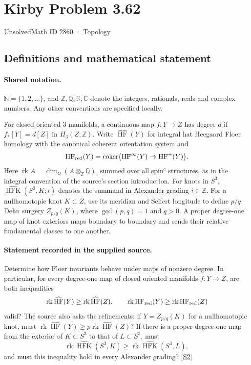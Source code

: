 \documentclass[11pt]{article}
\newcommand{\sref}[2]{\hyperlink{source:#1:#2}{[S#2]}}
\begin{document}
\setcounter{section}{2859}
\section{Kirby Problem 3.62}\label{2860}
{\small\sffamily UnsolvedMath ID 2860 · Topology}
\subsection{Definitions and mathematical statement}

\paragraph{Shared notation.}$\mathbb N=\{1,2,\ldots\}$, and $\mathbb Z,\mathbb Q,\mathbb R,\mathbb C$ denote the integers, rationals, reals and complex numbers. Any other conventions are specified locally.


For closed oriented $3$-manifolds, a continuous map $f:Y\to Z$ has degree $d$ if $f_*[Y]=d[Z]$ in $H_3(Z;\mathbb Z)$. Write $\widehat{\operatorname{HF}}(Y)$ for integral hat Heegaard Floer homology with the canonical coherent orientation system and
\[
\operatorname{HF}_{\rm red}(Y)=\operatorname{coker}\bigl(\operatorname{HF}^{\infty}(Y)\to\operatorname{HF}^{+}(Y)\bigr).
\]
Here $\operatorname{rk}A=\dim_{\mathbb Q}(A\otimes_{\mathbb Z}\mathbb Q)$, summed over all spin$^c$ structures, as in the integral convention of the source's section introduction. For knots in $S^3$, $\widehat{\operatorname{HFK}}(S^3,K;i)$ denotes the summand in Alexander grading $i\in\mathbb Z$.
For a nullhomotopic knot $K\subset Z$, use its meridian and Seifert longitude to define $p/q$ Dehn surgery $Z_{p/q}(K)$, where $\gcd(p,q)=1$ and $q>0$. A proper degree-one map of knot exteriors maps boundary to boundary and sends their relative fundamental classes to one another.
\paragraph{Statement recorded in the supplied source.}
Determine how Floer invariants behave under maps of nonzero degree. In particular, for every degree-one map of closed oriented manifolds $f:Y\to Z$, are both inequalities
\[
\operatorname{rk}\widehat{\operatorname{HF}}(Y)\ge\operatorname{rk}\widehat{\operatorname{HF}}(Z),\qquad
\operatorname{rk}\operatorname{HF}_{\rm red}(Y)\ge\operatorname{rk}\operatorname{HF}_{\rm red}(Z)
\]
valid? The source also asks the refinements: if $Y=Z_{p/q}(K)$ for a nullhomotopic knot, must $\operatorname{rk}\widehat{\operatorname{HF}}(Y)\ge p\operatorname{rk}\widehat{\operatorname{HF}}(Z)$? If there is a proper degree-one map from the exterior of $K\subset S^3$ to that of $L\subset S^3$, must
\[
\operatorname{rk}\widehat{\operatorname{HFK}}(S^3,K)\ge\operatorname{rk}\widehat{\operatorname{HFK}}(S^3,L),
\]
and must this inequality hold in every Alexander grading? \sref{2860}{2}
\end{document}
